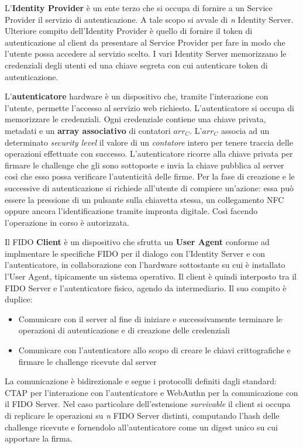 L'\textbf{Identity Provider} è un ente terzo che si occupa di fornire a un Service Provider il servizio di autenticazione. A tale scopo si avvale di \emph{n} Identity Server.
Ulteriore compito dell'Identity Provider è quello di fornire il token di autenticazione al client da presentare al Service Provider per fare in modo che l'utente possa accedere al servizio scelto.
I vari Identity Server memorizzano le credenziali degli utenti ed una chiave segreta con cui autenticare token di autenticazione.

L'\textbf{autenticatore} hardware è un dispositivo che, tramite l'interazione con l'utente, permette l'accesso al servizio web richiesto. L'autenticatore si occupa di memorizzare le credenziali. Ogni credenziale contiene una chiave privata, metadati e un \textbf{array associativo} di contatori ${arr_C}$. L'${arr_C}$ associa ad un determinato \emph{security level} il valore di un \emph{contatore} intero per tenere traccia delle operazioni effettuate con successo. L'autenticatore ricorre alla chiave privata per firmare le challenge che gli sono sottoposte e invia la chiave pubblica al server così che esso possa verificare l'autenticità delle firme. 
Per la fase di creazione e le successive di autenticazione si richiede all'utente di compiere un'azione: essa può essere la pressione di un pulsante sulla chiavetta stessa, un collegamento NFC oppure ancora l'identificazione tramite impronta digitale. Così facendo l'operazione in corso è autorizzata.

Il FIDO \textbf{Client} è un dispositivo che sfrutta un \textbf{User Agent} conforme ad implmentare le specifiche FIDO per il dialogo con l'Identity Server e con l'autenticatore, in collaborazione con l'hardware sottostante su cui è installato l'User Agent, tipicamente un sistema operativo. Il client è quindi interposto tra il FIDO Server e l'autenticatore fisico, agendo da intermediario. Il suo compito è duplice:
\begin{itemize}
	\item Comunicare con il server al fine di iniziare e successivamente terminare le operazioni di autenticazione e di creazione delle credenziali 
	\item Comunicare con l'autenticatore allo scopo di creare le chiavi crittografiche e firmare le challenge ricevute dal server
\end{itemize}
La comunicazione è bidirezionale e segue i protocolli definiti dagli standard: CTAP per l'interazione con l'autenticatore e WebAuthn per la comunicazione con il FIDO Server. 
Nel caso particolare dell'estensione \emph{survivable} il client si occupa di replicare le operazioni su \emph{n} FIDO Server distinti, computando l'hash delle challenge ricevute e fornendolo all'autenticatore come un digest unico su cui apportare la firma. 


